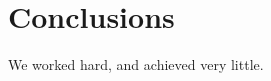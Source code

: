\documentclass[14pt]{article}
\begin{document}
 \section{Conclusions}\label{conclusions}
We worked hard, and achieved very little.

\end{document}
